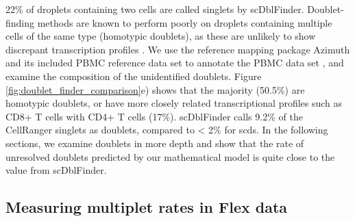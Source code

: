 \documentclass[unnumsec,webpdf,modern,large]{oup-authoring-template}
\begin{document}
	22\% of droplets containing two cells are called singlets by scDblFinder. 
	Doublet-finding methods are known to perform poorly on droplets containing multiple cells of the same type (homotypic doublets), as these are unlikely to show discrepant transcription profiles
	\citep{Xiong2022, Neavin2024}.
	We use the reference mapping package Azimuth and its included PBMC reference data set to annotate the PBMC data set
	\citep{Hao2021},
	and examine the composition of the unidentified doublets. 	
	Figure \ref{fig:doublet_finder_comparison}e) shows that the majority (50.5\%) are homotypic doublets, or have more closely related transcriptional profiles such as CD8+ T cells with CD4+ T cells (17\%).	
	scDblFinder calls 9.2\% of the CellRanger singlets as doublets, compared to < 2\% for scds. 
	In the following sections, we examine doublets in more depth and show that the rate of unresolved doublets predicted by our mathematical model is quite close to the value from scDblFinder.
	
	\subsection{Measuring multiplet rates in Flex data}
	
\end{document}
